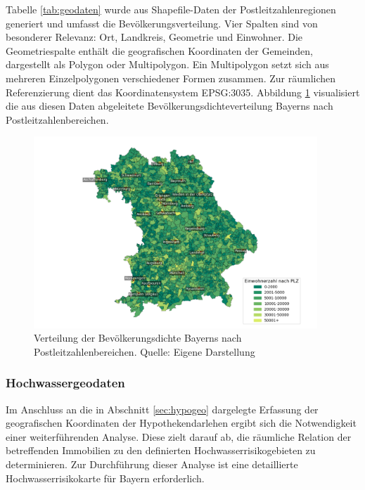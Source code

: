 Tabelle \ref{tab:geodaten} wurde aus Shapefile-Daten der Postleitzahlenregionen generiert und umfasst die Bevölkerungsverteilung. Vier Spalten sind von besonderer Relevanz: Ort, Landkreis, Geometrie und Einwohner. Die Geometriespalte enthält die geografischen Koordinaten der Gemeinden, dargestellt als Polygon oder Multipolygon. Ein Multipolygon setzt sich aus mehreren Einzelpolygonen verschiedener Formen zusammen. Zur räumlichen Referenzierung dient das Koordinatensystem EPSG:3035. Abbildung \ref{fig:bevoelkerungsdichte} visualisiert die aus diesen Daten abgeleitete Bevölkerungsdichteverteilung Bayerns nach Postleitzahlenbereichen.

\begin{figure}[htbp]
    \centering
    \includegraphics[width=0.95\textwidth]{figures/Bayern_pop_plz.png}
    \caption{Verteilung der Bevölkerungsdichte Bayerns nach Postleitzahlenbereichen. Quelle: Eigene Darstellung}
    \label{fig:bevoelkerungsdichte}
\end{figure}
\FloatBarrier



\subsubsection{Hochwassergeodaten}\label{sec:hochgeo}

Im Anschluss an die in Abschnitt \ref{sec:hypogeo} dargelegte Erfassung der geografischen Koordinaten der Hypothekendarlehen ergibt sich die Notwendigkeit einer weiterführenden Analyse. Diese zielt darauf ab, die räumliche Relation der betreffenden Immobilien zu den definierten Hochwasserrisikogebieten zu determinieren. Zur Durchführung dieser Analyse ist eine detaillierte Hochwasserrisikokarte für Bayern erforderlich.

